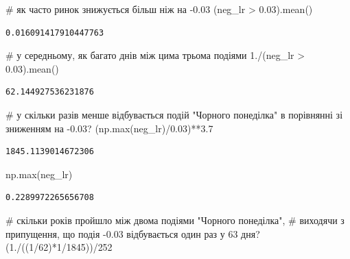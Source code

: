 \documentclass[
  letterpaper,
]{report}
\newenvironment{Shaded}{\begin{snugshade}}{\end{snugshade}}
\newcommand{\BuiltInTok}[1]{\textcolor[rgb]{0.00,0.23,0.31}{#1}}
\newcommand{\CommentTok}[1]{\textcolor[rgb]{0.37,0.37,0.37}{#1}}
\newcommand{\DecValTok}[1]{\textcolor[rgb]{0.68,0.00,0.00}{#1}}
\newcommand{\FloatTok}[1]{\textcolor[rgb]{0.68,0.00,0.00}{#1}}
\newcommand{\NormalTok}[1]{\textcolor[rgb]{0.00,0.23,0.31}{#1}}
\newcommand{\OperatorTok}[1]{\textcolor[rgb]{0.37,0.37,0.37}{#1}}
\begin{document}
\begin{Shaded}
\begin{Highlighting}[]
\CommentTok{\# як часто ринок знижується більш ніж на {-}0.03}
\NormalTok{(neg\_lr }\OperatorTok{\textgreater{}} \FloatTok{0.03}\NormalTok{).mean()}
\end{Highlighting}
\end{Shaded}

\begin{verbatim}
0.016091417910447763
\end{verbatim}

\begin{Shaded}
\begin{Highlighting}[]
\CommentTok{\# у середньому, як багато днів між цима трьома подіями}
\FloatTok{1.}\OperatorTok{/}\NormalTok{(neg\_lr }\OperatorTok{\textgreater{}} \FloatTok{0.03}\NormalTok{).mean()}
\end{Highlighting}
\end{Shaded}

\begin{verbatim}
62.144927536231876
\end{verbatim}

\begin{Shaded}
\begin{Highlighting}[]
\CommentTok{\# у скільки разів менше відбувається подій "Чорного понеділка" в порівнянні зі зниженням на {-}0.03?}
\NormalTok{(np.}\BuiltInTok{max}\NormalTok{(neg\_lr)}\OperatorTok{/}\FloatTok{0.03}\NormalTok{)}\OperatorTok{**}\FloatTok{3.7}
\end{Highlighting}
\end{Shaded}

\begin{verbatim}
1845.1139014672306
\end{verbatim}

\begin{Shaded}
\begin{Highlighting}[]
\NormalTok{np.}\BuiltInTok{max}\NormalTok{(neg\_lr)}
\end{Highlighting}
\end{Shaded}

\begin{verbatim}
0.2289972265656708
\end{verbatim}

\begin{Shaded}
\begin{Highlighting}[]
\CommentTok{\# скільки років пройшло між двома подіями "Чорного понеділка",}
\CommentTok{\# виходячи з припущення, що подія {-}0.03 відбувається один раз у 63 дня?}
\NormalTok{(}\FloatTok{1.}\OperatorTok{/}\NormalTok{((}\DecValTok{1}\OperatorTok{/}\DecValTok{62}\NormalTok{)}\OperatorTok{*}\DecValTok{1}\OperatorTok{/}\DecValTok{1845}\NormalTok{))}\OperatorTok{/}\DecValTok{252}
\end{Highlighting}
\end{Shaded}
\end{document}
